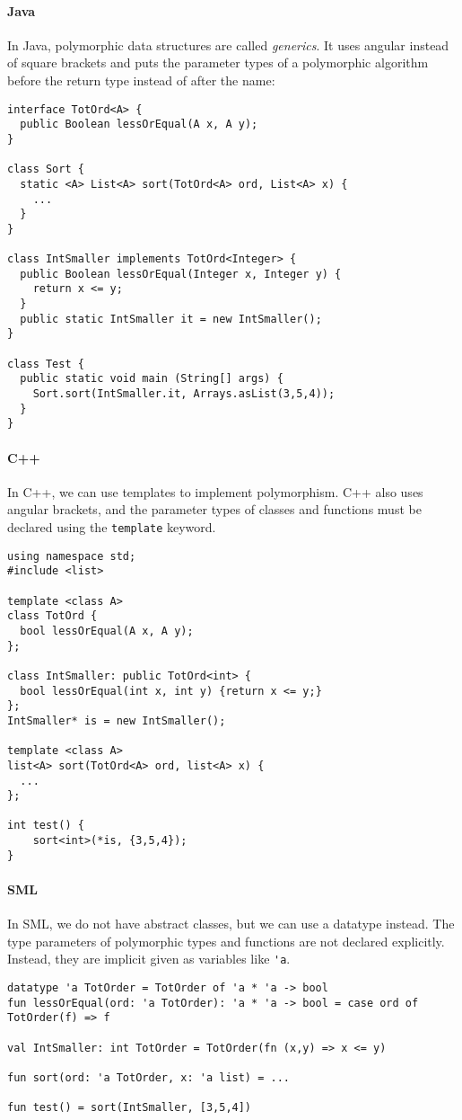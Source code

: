 \paragraph{Java}
In Java, polymorphic data structures are called \emph{generics}.
It uses angular instead of square brackets and puts the parameter types of a polymorphic algorithm before the return type instead of after the name:

\begin{lstlisting}
interface TotOrd<A> {
  public Boolean lessOrEqual(A x, A y);
}

class Sort {
  static <A> List<A> sort(TotOrd<A> ord, List<A> x) {
    ...
  }
}

class IntSmaller implements TotOrd<Integer> {
  public Boolean lessOrEqual(Integer x, Integer y) {
    return x <= y;
  }
  public static IntSmaller it = new IntSmaller();
}

class Test {
  public static void main (String[] args) {
    Sort.sort(IntSmaller.it, Arrays.asList(3,5,4));
  }
}
\end{lstlisting}

\paragraph{C++}
In C++, we can use templates to implement polymorphism.
C++ also uses angular brackets, and the parameter types of classes and functions must be declared using the \lstinline|template| keyword.

\begin{lstlisting}
using namespace std;
#include <list>

template <class A>
class TotOrd {
  bool lessOrEqual(A x, A y);
};

class IntSmaller: public TotOrd<int> {
  bool lessOrEqual(int x, int y) {return x <= y;}
};
IntSmaller* is = new IntSmaller();
  
template <class A>
list<A> sort(TotOrd<A> ord, list<A> x) {
  ...
};

int test() {
    sort<int>(*is, {3,5,4});  
}
\end{lstlisting}

\paragraph{SML}
In SML, we do not have abstract classes, but we can use a datatype instead.
The type parameters of polymorphic types and functions are not declared explicitly.
Instead, they are implicit given as variables like \lstinline|'a|.

\begin{lstlisting}
datatype 'a TotOrder = TotOrder of 'a * 'a -> bool
fun lessOrEqual(ord: 'a TotOrder): 'a * 'a -> bool = case ord of TotOrder(f) => f

val IntSmaller: int TotOrder = TotOrder(fn (x,y) => x <= y)

fun sort(ord: 'a TotOrder, x: 'a list) = ...

fun test() = sort(IntSmaller, [3,5,4])
\end{lstlisting}